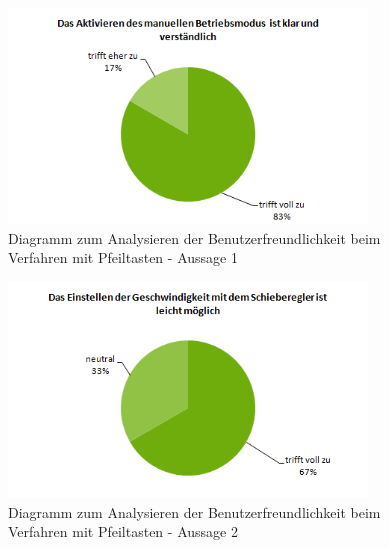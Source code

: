 \begin{figure}[H]
	\centering
		\includegraphics[width=0.85\textwidth]{03_Grafiken/Anhang/UsabilityDiagramme/Aufgabenteil3Aussage1.png}
	\caption[Diagramm zum Analysieren der Benutzerfreundlichkeit beim Verfahren mit Pfeiltasten - Aussage 1]{Diagramm zum Analysieren der Benutzerfreundlichkeit beim Verfahren mit Pfeiltasten - Aussage 1}
	\label{fig:Aufgabenteil3Aussage1}
\end{figure}
\begin{figure}[H]
	\centering
		\includegraphics[width=0.85\textwidth]{03_Grafiken/Anhang/UsabilityDiagramme/Aufgabenteil3Aussage2.png}
	\caption[Diagramm zum Analysieren der Benutzerfreundlichkeit beim Verfahren mit Pfeiltasten - Aussage 2]{Diagramm zum Analysieren der Benutzerfreundlichkeit beim Verfahren mit Pfeiltasten - Aussage 2}
	\label{fig:Aufgabenteil3Aussage2}
\end{figure}
